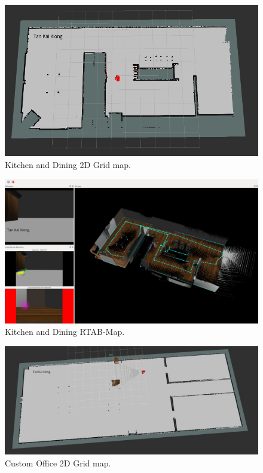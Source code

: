 \documentclass[10pt,journal,compsoc]{IEEEtran}
\begin{document}
\begin{figure}[thpb]
      \centering
      \includegraphics[width=\linewidth]{kitchen_2d_map.png}
      \caption{Kitchen and Dining 2D Grid map.}
      \label{fig:robot4}
\end{figure}

\begin{figure}[thpb]
      \centering
      \includegraphics[width=\linewidth]{kitchen_rtabmap.png}
      \caption{Kitchen and Dining RTAB-Map.}
      \label{fig:robot5}
\end{figure}

\begin{figure}[thpb]
      \centering
      \includegraphics[width=\linewidth]{custom_office_gridmap.png}
      \caption{Custom Office 2D Grid map.}
      \label{fig:robot6}
\end{figure}
\end{document}

